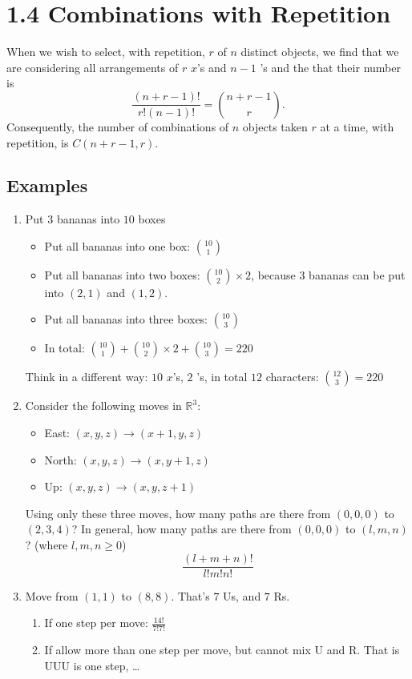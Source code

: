 \documentclass[a4paper]{article}
\begin{document}
\section*{1.4 Combinations with Repetition}
When we wish to select, with repetition, $r$ of $n$ distinct objects, we find that we are considering all arrangements of $r$ $x$'s and $n-1$ \textbar 's and the that their number is
$$
\frac{(n+r-1)!}{r!(n-1)!}=\binom{n+r-1}{r}.
$$
Consequently, the number of combinations of $n$ objects taken $r$ at a time, with repetition, is $C(n+r-1,r)$.
\subsection*{Examples}
\begin{enumerate}
    \item Put $3$ bananas into $10$ boxes
    \begin{itemize}
        \item Put all bananas into one box: $\binom{10}{1}$
        \item Put all bananas into two boxes: $\binom{10}{2}\times 2$, because $3$ bananas can be put into $(2,1)$ and $(1,2)$.
        \item Put all bananas into three boxes: $\binom{10}{3}$
        \item In total: $\binom{10}{1}+\binom{10}{2}\times 2+\binom{10}{3}=220$
    \end{itemize}
    Think in a different way: $10$ $x$'s, $2$ \textbar 's, in total $12$ characters: $\binom{12}{3}=220$
    \item Consider the following moves in $\mathbb{R}^3$:
    \begin{itemize}
        \item East: $(x,y,z)\rightarrow (x+1,y,z)$
        \item North: $(x,y,z)\rightarrow (x,y+1,z)$
        \item Up: $(x,y,z)\rightarrow (x,y,z+1)$
    \end{itemize}
    Using only these three moves, how many paths are there from $(0,0,0)$ to $(2,3,4)$? In general, how many paths are there from $(0,0,0)$ to $(l,m,n)$? (where $l,m,n\geq0$)\\
    $$
    \frac{(l+m+n)!}{l!m!n!}
    $$ 
    \item Move from $(1,1)$ to $(8,8)$. That's $7$ Us, and $7$ Rs.
    \begin{enumerate}
        \item If one step per move: $\frac{14!}{7!7!}$
        \item If allow more than one step per move, but cannot mix U and R. That is UUU is one step, \ldots\\

\end{enumerate}
\end{enumerate}
\end{document}

